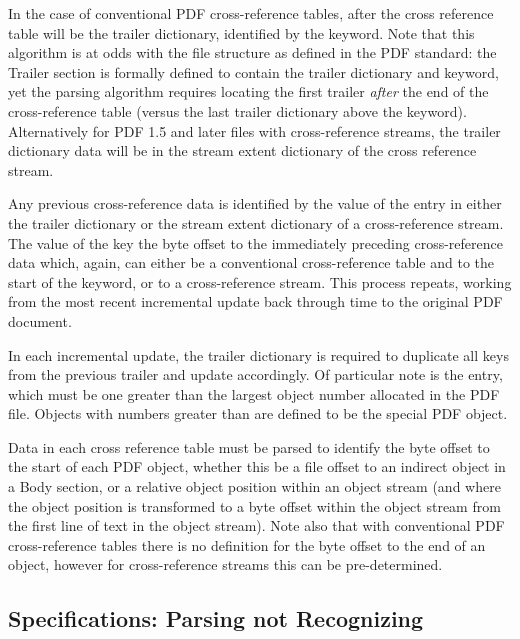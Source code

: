 In the case of conventional PDF
cross-reference tables, after the cross reference table will be the
trailer dictionary, identified by the  keyword. 
Note that this algorithm is at
odds with the file structure as defined in the PDF standard: the Trailer section is formally defined
to contain the trailer dictionary and  keyword, yet the parsing algorithm
requires locating the first trailer \emph{after} the end of the cross-reference table 
(versus the last trailer dictionary above the  keyword). 
Alternatively for PDF 1.5 and later files with cross-reference
streams, the trailer dictionary data will be in the stream extent
dictionary of the cross reference stream. 

Any previous cross-reference data is identified by the value of the  entry in either
the trailer dictionary or the stream extent dictionary of a cross-reference stream. The
value of the  key the byte offset to the immediately
preceding cross-reference data which, again, can either be a conventional
cross-reference table and to the start of the  keyword, or to a
cross-reference stream. This process repeats, working from the most recent incremental
update back through time to the original PDF document.

In each incremental update, the trailer dictionary is required to duplicate all keys from the previous
trailer and update accordingly. Of particular note is the  entry, which must be
one greater than the largest object number allocated in the PDF file. Objects with numbers greater
than  are defined to be the special PDF  object.

Data in each cross reference table must be parsed to
identify the byte offset to the start of each PDF object, whether this be a file offset to an indirect object in a Body section, or a relative object position within an object stream (and where the object position is transformed to a byte offset within the object stream from the first line of text in the object stream). Note also that with conventional PDF cross-reference tables there is no definition for the byte offset to the end of an object, however for cross-reference streams this can be pre-determined.


\subsection{Specifications: Parsing not Recognizing}
\label{sec:spec-approach}

